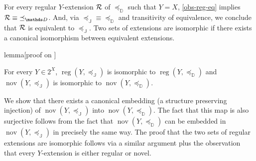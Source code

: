 \documentclass[12pt,a4paper,twoside]{article}
\newcommand{\reg}{\operatorname{reg}}
\newcommand{\nov}{\operatorname{nov}}
\newcommand{\preceqb}{\mathbin{\preceq}}
\newcommand{\ext}{\mathrel{\mc R}}
\newcommand{\extb}{\mathbin{\mc R}}
\newcommand{\mbbd}{{\mathds D}}
\newcommand{\mbbi}{{\mathds L}}
\newcommand{\mbbj}{\mathds J}
\begin{document}
\begin{appendices}
 For every regular $Y$-extension $ \ext$ of $\preceq_{\mbbd}$ such that $Y=X$,
 \cref{obs-reg-eq} implies $\extb\equiv \preceqb_{\mbbd} $. And, via
 $\preceqb_{\mbbj}\equiv \preceqb_{\mbbd}$ and transitivity of equivalence, we
 conclude that $\ext$ is equivalent to $\preceq_{\mbbj}$.  Two sets of
 extensions are isomorphic if there exists a canonical isomorphism between
 equivalent extensions. 


\begin{theoremEnd}{lemma}[proof on ]
  \label{lem-nov-iso}

  For every $Y \in 2 ^ { X } $, $\reg(Y, \preceqb_{\mbbj}) $ is isomorphic to
  $ \reg(Y,\preceqb_{\mbbd})$ and
  $\nov ( Y , \preceqb_{\mbbj} ) $ is isomorphic to $ \nov ( Y , \preceqb _ \mbbd )$.


\end{theoremEnd}
\begin{proofEnd}%
  \label{proof-nov-iso}

  We show that there exists a canonical embedding (a structure preserving
  injection) of $ \nov ( Y , \preceqb _ \mbbj ) $ into
  $ \nov ( Y , \preceqb _ \mbbd ) $. The fact that this map is also
  surjective follows from the fact that $ \nov ( Y , \preceqb _ \mbbd ) $
  can be embedded in $ \nov ( Y , \preceqb _ \mbbj ) $ in precisely the same
  way. The proof that the two sets of regular extensions are isomorphic follows
  via a similar argument plus the observation that every $Y$-extension is either
  regular or novel.


\end{proofEnd}
\end{appendices}
\end{document}
